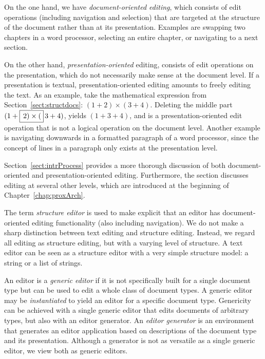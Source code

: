 On the one hand, we have {\em document-oriented editing}, which consists of edit operations (including navigation and selection) that are targeted at the structure of the document rather than at its presentation. Examples are swapping two chapters in a word processor, selecting an entire chapter, or navigating to a next section.

On the other hand, {\em presentation-oriented} editing, consists of edit operations on the presentation, which do not necessarily make sense at the document level. If a presentation is textual,  presentation-oriented editing amounts to freely editing the text. As an example, take the mathematical expression from Section~\ref{sect:structdocs}: $(1+2) \times (3+4)$. Deleting the middle part $(1+\framebox{$\,2) \times ($}\,3+4)$, yields $(1+3+4)$, and is a presentation-oriented edit operation that is not a logical operation on the document level. Another example is navigating downwards in a formatted paragraph of a word processor, since the concept of lines in a paragraph only exists at the presentation level. 

Section~\ref{sect:intrProcess} provides a more thorough discussion of both document-oriented and presentation-oriented editing. Furthermore, the section discusses editing at several other levels, which are introduced at the beginning of Chapter~\ref{chap:proxArch}.


The term {\em structure editor} is used to make explicit that an editor has document-oriented editing functionality (also including navigation). We do not make a sharp distinction between text editing and structure editing. Instead, we regard all editing as structure editing, but with a varying level of structure. A text editor can be seen as a structure editor with a very simple structure model: a string or a list of strings. 

An editor is a {\em generic editor} if it is not specifically built for a single document type but can be used to edit a whole class of document types. A generic editor may be {\em instantiated} to yield an editor for a specific document type. Genericity can be achieved with a single generic editor that edits documents of arbitrary types, but also with an editor generator. An {\em editor generator} is an environment that generates an editor application based on descriptions of the document type and its presentation. Although a generator is not as versatile as a single generic editor, we view both as generic editors. 

